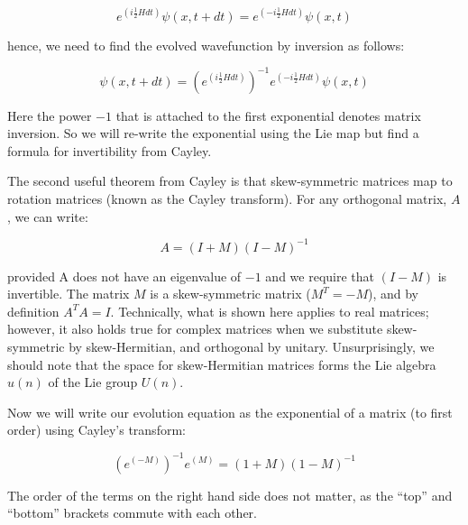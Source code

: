 \begin{equation}
 e^{(i\frac{1}{2}Hdt)} \psi(x, t+dt) = e^{(-i\frac{1}{2}Hdt)} \psi(x, t)
\end{equation}

\noindent hence, we need to find the evolved wavefunction by inversion as follows:

\begin{equation}
\psi(x, t+dt) =  (e^{(i\frac{1}{2}Hdt)})^{-1} e^{(-i\frac{1}{2}Hdt)} \psi(x, t)
\end{equation}

\noindent Here the power $-1$ that is attached to the first exponential denotes matrix inversion. So we will re-write the exponential using the Lie map but find a formula for invertibility from Cayley.

The second useful theorem from Cayley is that skew-symmetric matrices map to rotation matrices (known as the Cayley transform). For any orthogonal matrix, $A$, we can write:

\begin{equation}
A = (I + M)(I - M)^{-1}
\end{equation}

\noindent provided A does not have an eigenvalue of $-1$ and we require that $(I - M)$ is invertible. The matrix $M$ is a skew-symmetric matrix ($M^T = -M$), and by definition $A^T A = I$. Technically, what is shown here applies to real matrices; however, it also holds true for complex matrices when we substitute skew-symmetric by skew-Hermitian, and orthogonal by unitary. Unsurprisingly, we should note that the space for skew-Hermitian matrices forms the Lie algebra $u(n)$ of the Lie group $U(n)$.

Now we will write our evolution equation as the exponential of a matrix (to first order) using Cayley's transform:

\begin{equation}
 (e^{(-M)})^{-1} e^{(M)} = (1 + M)(1 - M)^{-1}
\end{equation}

\noindent The order of the terms on the right hand side does not matter, as the ``top'' and ``bottom'' brackets commute with each other.


